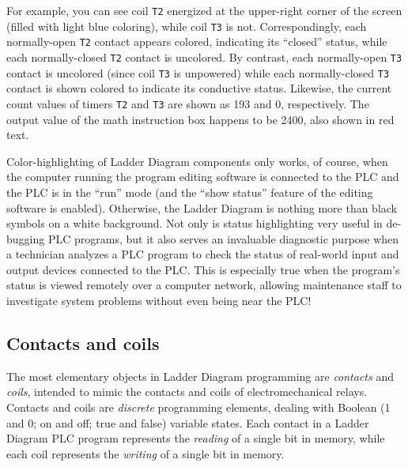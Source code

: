 For example, you can see coil \texttt{T2} energized at the upper-right corner of the screen (filled with light blue coloring), while coil \texttt{T3} is not.  Correspondingly, each normally-open \texttt{T2} contact appears colored, indicating its ``closed'' status, while each normally-closed \texttt{T2} contact is uncolored.  By contrast, each normally-open \texttt{T3} contact is uncolored (since coil \texttt{T3} is unpowered) while each normally-closed \texttt{T3} contact is shown colored to indicate its conductive status.  Likewise, the current count values of timers \texttt{T2} and \texttt{T3} are shown as 193 and 0, respectively.  The output value of the math instruction box happens to be 2400, also shown in red text.  

Color-highlighting of Ladder Diagram components only works, of course, when the computer running the program editing software is connected to the PLC and the PLC is in the ``run'' mode (and the ``show status'' feature of the editing software is enabled).  Otherwise, the Ladder Diagram is nothing more than black symbols on a white background.  Not only is status highlighting very useful in de-bugging PLC programs, but it also serves an invaluable diagnostic purpose when a technician analyzes a PLC program to check the status of real-world input and output devices connected to the PLC.  This is especially true when the program's status is viewed remotely over a computer network, allowing maintenance staff to investigate system problems without even being near the PLC!







\filbreak
\subsection{Contacts and coils}

The most elementary objects in Ladder Diagram programming are \textit{contacts} and \textit{coils}, intended to mimic the contacts and coils of electromechanical relays.  Contacts and coils are \textit{discrete} programming elements, dealing with Boolean (1 and 0; on and off; true and false) variable states.  Each contact in a Ladder Diagram PLC program represents the \textit{reading} of a single bit in memory, while each coil represents the \textit{writing} of a single bit in memory.    

